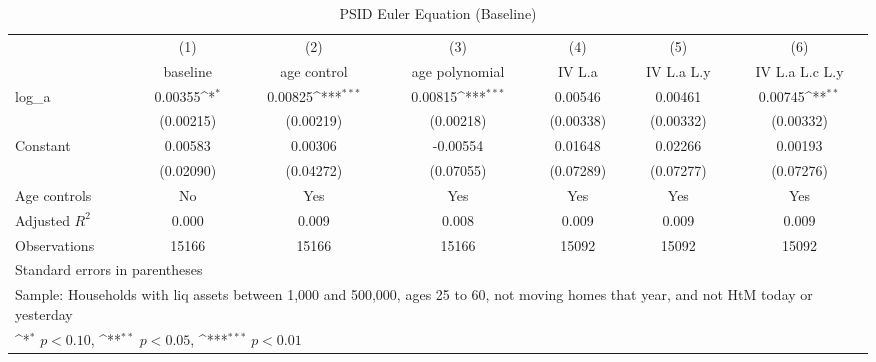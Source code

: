 {
\def\sym#1{\ifmmode^{#1}\else\(^{#1}\)\fi}
\begin{longtable}{l*{6}{c}}
\caption{PSID Euler Equation (Baseline)}\\
\toprule\endfirsthead\midrule\endhead\midrule\endfoot\endlastfoot
                    &\multicolumn{1}{c}{(1)}&\multicolumn{1}{c}{(2)}&\multicolumn{1}{c}{(3)}&\multicolumn{1}{c}{(4)}&\multicolumn{1}{c}{(5)}&\multicolumn{1}{c}{(6)}\\
                    &\multicolumn{1}{c}{baseline}&\multicolumn{1}{c}{age control}&\multicolumn{1}{c}{age polynomial}&\multicolumn{1}{c}{IV L.a}&\multicolumn{1}{c}{IV L.a L.y}&\multicolumn{1}{c}{IV L.a L.c L.y}\\
\midrule
log\_a               &     0.00355\sym{*}  &     0.00825\sym{***}&     0.00815\sym{***}&     0.00546         &     0.00461         &     0.00745\sym{**} \\
                    &   (0.00215)         &   (0.00219)         &   (0.00218)         &   (0.00338)         &   (0.00332)         &   (0.00332)         \\
\addlinespace
Constant            &     0.00583         &     0.00306         &    -0.00554         &     0.01648         &     0.02266         &     0.00193         \\
                    &   (0.02090)         &   (0.04272)         &   (0.07055)         &   (0.07289)         &   (0.07277)         &   (0.07276)         \\
\addlinespace
Age controls        &          No         &         Yes         &         Yes         &         Yes         &         Yes         &         Yes         \\
\midrule
Adjusted \(R^{2}\)  &       0.000         &       0.009         &       0.008         &       0.009         &       0.009         &       0.009         \\
Observations        &       15166         &       15166         &       15166         &       15092         &       15092         &       15092         \\
\bottomrule
\multicolumn{7}{l}{\footnotesize Standard errors in parentheses}\\
\multicolumn{7}{l}{\footnotesize Sample: Households with liq assets between 1,000 and 500,000, ages 25 to 60, not moving homes that year, and not HtM today or yesterday}\\
\multicolumn{7}{l}{\footnotesize \sym{*} \(p<0.10\), \sym{**} \(p<0.05\), \sym{***} \(p<0.01\)}\\
\end{longtable}
}
